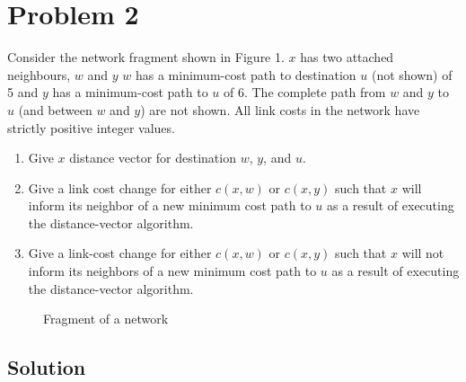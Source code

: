 \section*{Problem 2}

Consider the network fragment shown in Figure 1.
$x$ has two attached neighbours, $w$ and $y$
$w$ has a minimum-cost path to destination $u$ (not shown) of 5 and $y$ has a minimum-cost path to $u$ of 6.
The complete path from $w$ and $y$ to $u$ (and between $w$ and $y$) are not shown.
All link costs in the network have strictly positive integer values.

\begin{enumerate}
    \item Give $x$ distance vector for destination $w$, $y$, and $u$.
    \item Give a link cost change for either $c(x, w)$ or $c(x, y)$ such that $x$ will inform its neighbor of a new minimum cost path to $u$ as a result of executing the distance-vector algorithm.
    \item Give a link-cost change for either $c(x, w)$ or $c(x, y)$ such that $x$ will not inform its neighbors of a new minimum cost path to $u$ as a result of executing the distance-vector algorithm.
\end{enumerate}

\begin{figure}[H]
    \centering
    \caption{Fragment of a network}
\end{figure}

\subsection*{Solution}


